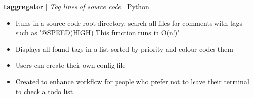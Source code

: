 \textbf{taggregator} | \textit{Tag lines of source code} | {Python}
\begin{itemize}
    \item Runs in a source code root directory, search all files for comments with tags such as "@SPEED(HIGH) This function runs in O(n!)"
    \item Displays all found tags in a list sorted by priority and colour codes them
    \item Users can create their own config file
    \item Created to enhance workflow for people who prefer not to leave their terminal to check a todo list
\end{itemize}
